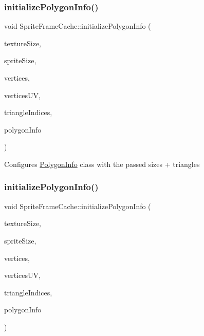 \subsubsection{\texorpdfstring{initialize\+Polygon\+Info()}{initializePolygonInfo()}\hspace{0.1cm}{\footnotesize\ttfamily [1/2]}}
{\footnotesize\ttfamily void Sprite\+Frame\+Cache\+::initialize\+Polygon\+Info (\begin{DoxyParamCaption}\item[{const \hyperlink{classSize}{Size} \&}]{texture\+Size,  }\item[{const \hyperlink{classSize}{Size} \&}]{sprite\+Size,  }\item[{const std\+::vector$<$ int $>$ \&}]{vertices,  }\item[{const std\+::vector$<$ int $>$ \&}]{vertices\+UV,  }\item[{const std\+::vector$<$ int $>$ \&}]{triangle\+Indices,  }\item[{\hyperlink{classPolygonInfo}{Polygon\+Info} \&}]{polygon\+Info }\end{DoxyParamCaption})\hspace{0.3cm}{\ttfamily [protected]}}

Configures \hyperlink{classPolygonInfo}{Polygon\+Info} class with the passed sizes + triangles \mbox{\label{classSpriteFrameCache_a3b4d6f3e1281bc0251699b156cf0b680}} 
\subsubsection{\texorpdfstring{initialize\+Polygon\+Info()}{initializePolygonInfo()}\hspace{0.1cm}{\footnotesize\ttfamily [2/2]}}
{\footnotesize\ttfamily void Sprite\+Frame\+Cache\+::initialize\+Polygon\+Info (\begin{DoxyParamCaption}\item[{const \hyperlink{classSize}{Size} \&}]{texture\+Size,  }\item[{const \hyperlink{classSize}{Size} \&}]{sprite\+Size,  }\item[{const std\+::vector$<$ int $>$ \&}]{vertices,  }\item[{const std\+::vector$<$ int $>$ \&}]{vertices\+UV,  }\item[{const std\+::vector$<$ int $>$ \&}]{triangle\+Indices,  }\item[{\hyperlink{classPolygonInfo}{Polygon\+Info} \&}]{polygon\+Info }\end{DoxyParamCaption})\hspace{0.3cm}{\ttfamily [protected]}}

